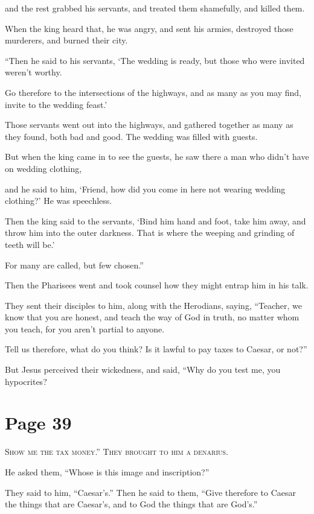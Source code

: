 and the rest grabbed his servants, and treated them shamefully, and killed them.

When the king heard that, he was angry, and sent his armies, destroyed those murderers, and burned their city.

“Then he said to his servants, ‘The wedding is ready, but those who were invited weren’t worthy.

Go therefore to the intersections of the highways, and as many as you may find, invite to the wedding feast.’

Those servants went out into the highways, and gathered together as many as they found, both bad and good. The wedding was filled with guests.

But when the king came in to see the guests, he saw there a man who didn’t have on wedding clothing,

and he said to him, ‘Friend, how did you come in here not wearing wedding clothing?’ He was speechless.

Then the king said to the servants, ‘Bind him hand and foot, take him away, and throw him into the outer darkness. That is where the weeping and grinding of teeth will be.’

For many are called, but few chosen.”

Then the Pharisees went and took counsel how they might entrap him in his talk.

They sent their disciples to him, along with the Herodians, saying, “Teacher, we know that you are honest, and teach the way of God in truth, no matter whom you teach, for you aren’t partial to anyone.

Tell us therefore, what do you think? Is it lawful to pay taxes to Caesar, or not?”

But Jesus perceived their wickedness, and said, “Why do you test me, you hypocrites?



\chapterornament
\section*{Page 39}

\lettrine{S}{how me the tax money.” They brought to him a denarius.}

He asked them, “Whose is this image and inscription?”

They said to him, “Caesar’s.” Then he said to them, “Give therefore to Caesar the things that are Caesar’s, and to God the things that are God’s.”


